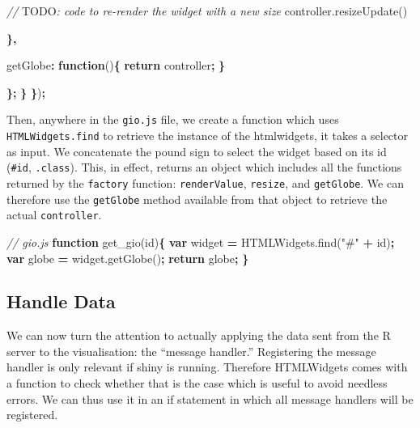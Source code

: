 \documentclass[
]{krantz}
\makeatletter
\newenvironment{Shaded}{\begin{snugshade}}{\end{snugshade}}
\newcommand{\AlertTok}[1]{\textcolor[rgb]{0.33,0.33,0.33}{#1}}
\newcommand{\AttributeTok}[1]{\textcolor[rgb]{0.61,0.61,0.61}{#1}}
\newcommand{\CommentTok}[1]{\textcolor[rgb]{0.37,0.37,0.37}{\textit{#1}}}
\newcommand{\ControlFlowTok}[1]{\textcolor[rgb]{0.27,0.27,0.27}{\textbf{#1}}}
\newcommand{\DataTypeTok}[1]{\textcolor[rgb]{0.27,0.27,0.27}{#1}}
\newcommand{\KeywordTok}[1]{\textcolor[rgb]{0.27,0.27,0.27}{\textbf{#1}}}
\newcommand{\NormalTok}[1]{#1}
\newcommand{\OperatorTok}[1]{\textcolor[rgb]{0.43,0.43,0.43}{\textbf{#1}}}
\newcommand{\StringTok}[1]{\textcolor[rgb]{0.5,0.5,0.5}{#1}}
\newcommand{\VariableTok}[1]{\textcolor[rgb]{0,0,0}{#1}}
\newenvironment{kframe}{%
\medskip{}
\setlength{\fboxsep}{.8em}
 \def\at@end@of@kframe{}%
 \ifinner\ifhmode%
  \def\at@end@of@kframe{\end{minipage}}%
  \begin{minipage}{\columnwidth}%
 \fi\fi%
 \def\FrameCommand##1{\hskip\@totalleftmargin \hskip-\fboxsep
 \colorbox{shadecolor}{##1}\hskip-\fboxsep
     \hskip-\linewidth \hskip-\@totalleftmargin \hskip\columnwidth}%
 \MakeFramed {\advance\hsize-\width
   \@totalleftmargin\z@ \linewidth\hsize
   \@setminipage}}%
 {\par\unskip\endMakeFramed%
 \at@end@of@kframe}
\renewenvironment{Shaded}{\begin{kframe}}{\end{kframe}}
\makeatother
\begin{document}
\begin{Shaded}
\begin{Highlighting}[]
        \CommentTok{// }\AlertTok{TODO}\CommentTok{: code to re{-}render the widget with a new size}
        \VariableTok{controller}\NormalTok{.}\AttributeTok{resizeUpdate}\NormalTok{()}

      \OperatorTok{\},}

      \DataTypeTok{getGlobe}\OperatorTok{:} \KeywordTok{function}\NormalTok{()}\OperatorTok{\{}
        \ControlFlowTok{return}\NormalTok{ controller}\OperatorTok{;}
      \OperatorTok{\}}

    \OperatorTok{\};}
  \OperatorTok{\}}
\OperatorTok{\}}\NormalTok{)}\OperatorTok{;}
\end{Highlighting}
\end{Shaded}

Then, anywhere in the \texttt{gio.js} file, we create a function which uses \texttt{HTMLWidgets.find} to retrieve the instance of the htmlwidgets, it takes a selector as input. We concatenate the pound sign to select the widget based on its id (\texttt{\#id}, \texttt{.class}). This, in effect, returns an object which includes all the functions returned by the \texttt{factory} function: \texttt{renderValue}, \texttt{resize}, and \texttt{getGlobe}. We can therefore use the \texttt{getGlobe} method available from that object to retrieve the actual \texttt{controller}.

\begin{Shaded}
\begin{Highlighting}[]
\CommentTok{// gio.js}
\KeywordTok{function} \AttributeTok{get\_gio}\NormalTok{(id)}\OperatorTok{\{}
  \KeywordTok{var}\NormalTok{ widget }\OperatorTok{=} \VariableTok{HTMLWidgets}\NormalTok{.}\AttributeTok{find}\NormalTok{(}\StringTok{"\#"} \OperatorTok{+}\NormalTok{ id)}\OperatorTok{;}
  \KeywordTok{var}\NormalTok{ globe }\OperatorTok{=} \VariableTok{widget}\NormalTok{.}\AttributeTok{getGlobe}\NormalTok{()}\OperatorTok{;}
  \ControlFlowTok{return}\NormalTok{ globe}\OperatorTok{;}
\OperatorTok{\}}
\end{Highlighting}
\end{Shaded}

\hypertarget{shiny-widgets-handle-data}{%
\subsection{Handle Data}\label{shiny-widgets-handle-data}}

We can now turn the attention to actually applying the data sent from the R server to the visualisation: the ``message handler.'' Registering the message handler is only relevant if shiny is running. Therefore HTMLWidgets comes with a function to check whether that is the case which is useful to avoid needless errors. We can thus use it in an if statement in which all message handlers will be registered.
\end{document}
